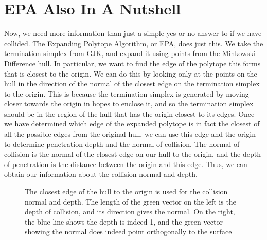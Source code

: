 \documentclass{article}
\begin{document}
\section{EPA Also In A Nutshell}
Now, we need more information than just a simple yes or no answer to if we have collided. The Expanding Polytope Algorithm, or EPA, does just this. We take the termination simplex from GJK, and expand it using points from the Minkowski Difference hull. In particular, we want to find the edge of the polytope this forms that is closest to the origin. We can do this by looking only at the points on the hull in the direction of the normal of the closest edge on the termination simplex to the origin. This is because the termination simplex is generated by moving closer towards the origin in hopes to enclose it, and so the termination simplex should be in the region of the hull that has the origin closest to its edges. Once we have determined which edge of the expanded polytope is in fact the closest of all the possible edges from the original hull, we can use this edge and the origin to determine penetration depth and the normal of collision.  The normal of collision is the normal of the closest edge on our hull to the origin, and the depth of penetration is the distance between the origin and this edge. Thus, we can obtain our information about the collision normal and depth.
\begin{figure}[!ht]
    \centering
    \caption{The closest edge of the hull to the origin is used for the collision normal and depth. The length of the green vector on the left is the depth of collision, and its direction gives the normal. On the right, the blue line shows the depth is indeed 1, and the green vector showing the normal does indeed point orthogonally to the surface}
\end{figure}
\end{document}
